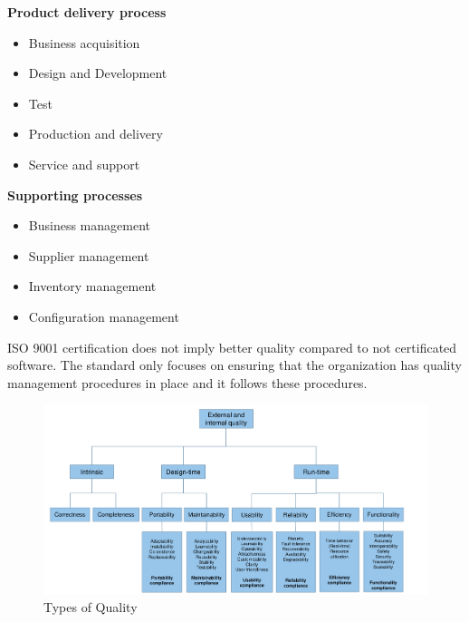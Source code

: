 \begin{minipage}[t]{0.49\textwidth}
    \textbf{Product delivery process}
    \begin{itemize}[topsep=0pt, itemsep=0pt]
        \item Business acquisition
        \item Design and Development
        \item Test
        \item Production and delivery
        \item Service and support
    \end{itemize}
\end{minipage}
\begin{minipage}[t]{0.49\textwidth}
    \textbf{Supporting processes}
    \begin{itemize}[topsep=0pt, itemsep=0pt]
        \item Business management
        \item Supplier management
        \item Inventory management
        \item Configuration management
    \end{itemize}
\end{minipage}
\newline

ISO 9001 certification does not imply better quality compared to not certificated software.
The standard only focuses on ensuring that the organization has quality management procedures in place and it follows these procedures.

\begin{figure}[h]
    \centering
    \includegraphics[width=\linewidth]{images/types_of_quality.png}
    \caption{Types of Quality}\label{fig:se_types_of_quality}
\end{figure}